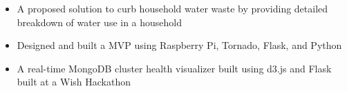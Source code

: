 \documentclass[10pt,a4paper,academicons]{altacv}
\begin{document}

\begin{itemize}
\item A proposed solution to curb household water waste by providing detailed breakdown of water use in a household
\item Designed and built a MVP using Raspberry Pi, Tornado, Flask, and Python
\end{itemize}
\divider

\begin{itemize}
\item A real-time MongoDB cluster health visualizer built using d3.js and Flask
    built at a Wish Hackathon
\end{itemize}
\end{document}
